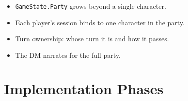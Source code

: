 \documentclass[a4paper,10pt]{article}
\begin{document}
\begin{itemize}
  \item \texttt{GameState.Party} grows beyond a single character.
  \item Each player's session binds to one character in the party.
  \item Turn ownership: whose turn it is and how it passes.
  \item The DM narrates for the full party.
\end{itemize}

\section{Implementation Phases}
\end{document}
